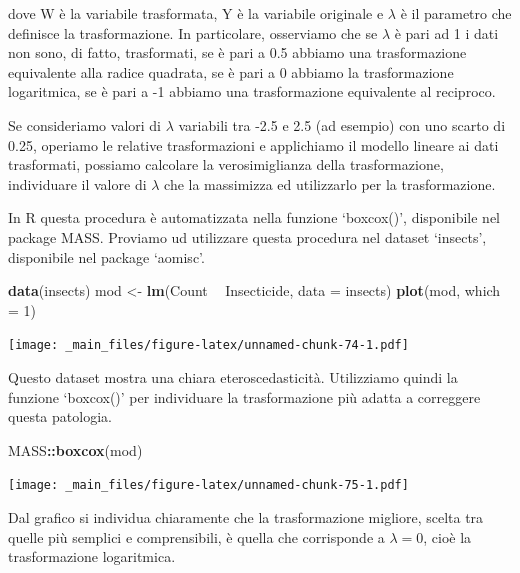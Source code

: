 \documentclass[a4paper,12pt,oneside]{book}
\newenvironment{Shaded}{\begin{snugshade}}{\end{snugshade}}
\newcommand{\KeywordTok}[1]{\textcolor[rgb]{0.13,0.29,0.53}{\textbf{#1}}}
\newcommand{\DataTypeTok}[1]{\textcolor[rgb]{0.13,0.29,0.53}{#1}}
\newcommand{\DecValTok}[1]{\textcolor[rgb]{0.00,0.00,0.81}{#1}}
\newcommand{\StringTok}[1]{\textcolor[rgb]{0.31,0.60,0.02}{#1}}
\newcommand{\OperatorTok}[1]{\textcolor[rgb]{0.81,0.36,0.00}{\textbf{#1}}}
\newcommand{\NormalTok}[1]{#1}
\theoremstyle{definition}
\theoremstyle{definition}
\theoremstyle{definition}
\theoremstyle{remark}
\begin{document}
dove W è la variabile trasformata, Y è la variabile originale e
\(\lambda\) è il parametro che definisce la trasformazione. In
particolare, osserviamo che se \(\lambda\) è pari ad 1 i dati non sono,
di fatto, trasformati, se è pari a 0.5 abbiamo una trasformazione
equivalente alla radice quadrata, se è pari a 0 abbiamo la
trasformazione logaritmica, se è pari a -1 abbiamo una trasformazione
equivalente al reciproco.

Se consideriamo valori di \(\lambda\) variabili tra -2.5 e 2.5 (ad
esempio) con uno scarto di 0.25, operiamo le relative trasformazioni e
applichiamo il modello lineare ai dati trasformati, possiamo calcolare
la verosimiglianza della trasformazione, individuare il valore di
\(\lambda\) che la massimizza ed utilizzarlo per la trasformazione.

In R questa procedura è automatizzata nella funzione `boxcox()',
disponibile nel package MASS. Proviamo ud utilizzare questa procedura
nel dataset `insects', disponibile nel package `aomisc'.

\begin{Shaded}
\begin{Highlighting}[]
\KeywordTok{data}\NormalTok{(insects)}
\NormalTok{mod <-}\StringTok{ }\KeywordTok{lm}\NormalTok{(Count }\OperatorTok{~}\StringTok{ }\NormalTok{Insecticide, }\DataTypeTok{data =}\NormalTok{ insects)}
\KeywordTok{plot}\NormalTok{(mod, }\DataTypeTok{which =} \DecValTok{1}\NormalTok{)}
\end{Highlighting}
\end{Shaded}

\texttt{[image: \_main\_files/figure-latex/unnamed-chunk-74-1.pdf]}

Questo dataset mostra una chiara eteroscedasticità. Utilizziamo quindi
la funzione `boxcox()' per individuare la trasformazione più adatta a
correggere questa patologia.

\begin{Shaded}
\begin{Highlighting}[]
\NormalTok{MASS}\OperatorTok{::}\KeywordTok{boxcox}\NormalTok{(mod)}
\end{Highlighting}
\end{Shaded}

\texttt{[image: \_main\_files/figure-latex/unnamed-chunk-75-1.pdf]}

Dal grafico si individua chiaramente che la trasformazione migliore,
scelta tra quelle più semplici e comprensibili, è quella che corrisponde
a \(\lambda = 0\), cioè la trasformazione logaritmica.
\end{document}
